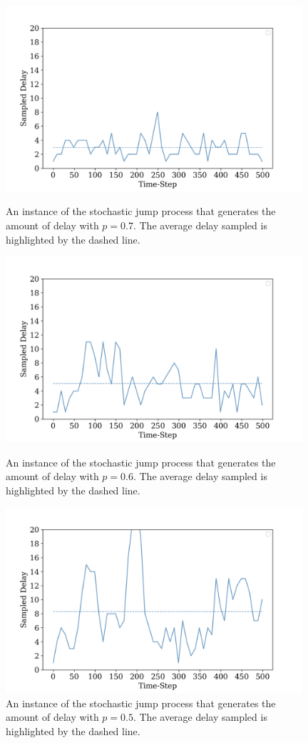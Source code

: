                 \begin{figure}[hbtp]
                    \centering
                    \includegraphics[width=11cm]{images/results/delayp07_sampledelay_1.png}
                    \caption{An instance of the stochastic jump process that generates the amount of delay with $p = 0.7$. The average delay sampled is highlighted by the dashed line.}
                    \label{fig:delayp07_sampledelay}
                    
                    \centering 
                    \includegraphics[width=11cm]{images/results/delayp06_sampledelay_1.png}
                    \caption{An instance of the stochastic jump process that generates the amount of delay with $p = 0.6$. The average delay sampled is highlighted by the dashed line.}
                    \label{fig:delayp06_sampledelay}
                    
                    \centering
                    \includegraphics[width=11cm]{images/results/delayp05_sampledelay_1.png}
                    \caption{An instance of the stochastic jump process that generates the amount of delay with $p = 0.5$. The average delay sampled is highlighted by the dashed line.}
                    \label{fig:delayp05_sampledelay}
                \end{figure}
